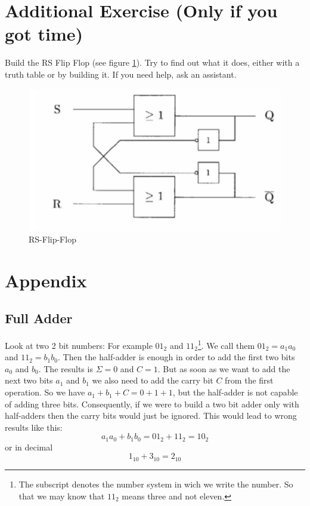 \documentclass[10pt,a4paper]{article}
\begin{document}
	\section{Additional Exercise (Only if you got time)}
	Build the RS Flip Flop (see figure \ref{fig:RSFF}). Try to find out what it does, either with a truth table or by building it. If you need help, ask an assistant.
	
	\begin{figure}[H]
		\centering
		\includegraphics[height=0.35\textwidth]{RSFF}%
		\caption{RS-Flip-Flop}%
		\label{fig:RSFF}
	\end{figure}
	
	\section{Appendix}
	\subsection{Full Adder}\label{subsec:appendix-full-adder}
	
	Look at two 2 bit numbers: For example $01_2$ and $11_2$\footnote{The subscript denotes the number system in wich we write the number. So that we may know that $11_2$ means three and not eleven.}.  We call them $01_2 = a_1a_0$ and $11_2 = b_1b_0$. Then the half-adder is enough in order to add the first two bits $a_0$ and $b_0$. The results is $\Sigma=0$ and $C=1$. But as soon as we want to add the next two bits $a_1$ and $b_1$ we also need to add the carry bit $C$ from the first operation. So we have $a_1+b_1+C = 0 + 1 + 1$, but the half-adder is not capable of adding three bits. Consequently, if we were to build a two bit adder only with half-adders then the carry bits would just be ignored. This would lead to wrong results like this:
	\[
	a_1a_0 + b_1b_0 = 01_2 + 11_2 = 10_2
	\]
	or in decimal
	\[
	1_{10} + 3_{10} = 2_{10}
	\]
\end{document}
